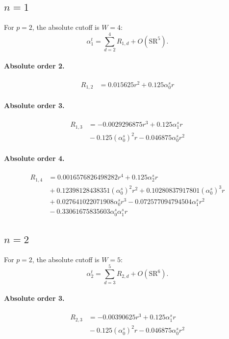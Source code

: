 \documentclass[10pt]{article}
\begin{document}
\subsection{$n=1$}
For $p=2$, the absolute cutoff is $W=4$:
\[\alpha_{1}^t=\sum_{d=2}^{4}R_{1,d}+O(\mathrm{SR}^{5}).\]
\paragraph{Absolute order 2.}
\begin{align*}
R_{1,2} &= 0.015625 r^{2} + 0.125 \alpha_{0}^s r
\end{align*}

\paragraph{Absolute order 3.}
\begin{align*}
R_{1,3} &=  - 0.0029296875 r^{3} + 0.125 \alpha_{1}^s r \\
&{}  - 0.125 \left(\alpha_{0}^s\right)^{2} r - 0.046875 \alpha_{0}^s r^{2}
\end{align*}

\paragraph{Absolute order 4.}
\begin{align*}
R_{1,4} &= 0.0016576826498282 r^{4} + 0.125 \alpha_{2}^s r \\
&{}  + 0.12398128438351 \left(\alpha_{0}^s\right)^{2} r^{2} + 0.10280837917801 \left(\alpha_{0}^s\right)^{3} r \\
&{}  + 0.027641022071908 \alpha_{0}^s r^{3} - 0.072577094794504 \alpha_{1}^s r^{2} \\
&{}  - 0.33061675835603 \alpha_{0}^s \alpha_{1}^s r
\end{align*}

\subsection{$n=2$}
For $p=2$, the absolute cutoff is $W=5$:
\[\alpha_{2}^t=\sum_{d=3}^{5}R_{2,d}+O(\mathrm{SR}^{6}).\]
\paragraph{Absolute order 3.}
\begin{align*}
R_{2,3} &=  - 0.00390625 r^{3} + 0.125 \alpha_{1}^s r \\
&{}  - 0.125 \left(\alpha_{0}^s\right)^{2} r - 0.046875 \alpha_{0}^s r^{2}
\end{align*}
\end{document}
